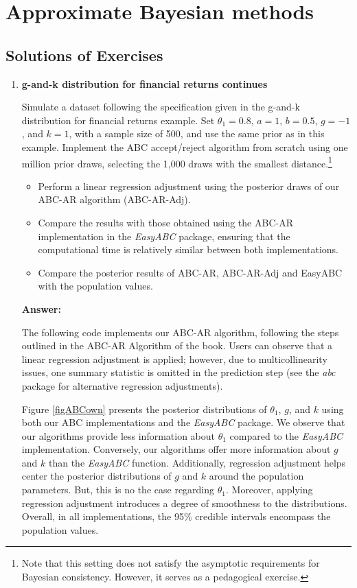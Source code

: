 \chapter{Approximate Bayesian methods}\label{chap15}

\section*{Solutions of Exercises}\label{sec11_1}
\begin{enumerate}[leftmargin=*]

\item \textbf{g-and-k distribution for financial returns continues}

Simulate a dataset following the specification given in the g-and-k distribution for financial returns example. Set $\theta_1 = 0.8$, $a = 1$, $b = 0.5$, $g = -1$, and $k = 1$, with a sample size of 500, and use the same prior as in this example. Implement the ABC accept/reject algorithm from scratch using one million prior draws, selecting the 1,000 draws with the smallest distance.\footnote{Note that this setting does not satisfy the asymptotic requirements for Bayesian consistency. However, it serves as a pedagogical exercise.}

\begin{itemize}
	\item Perform a linear regression adjustment using the posterior draws of our ABC-AR algorithm (ABC-AR-Adj).
	\item Compare the results with those obtained using the ABC-AR implementation in the \textit{EasyABC} package, ensuring that the computational time is relatively similar between both implementations.
	\item Compare the posterior results of ABC-AR, ABC-AR-Adj and EasyABC with the population values.
\end{itemize}

\textbf{Answer:}

The following code implements our ABC-AR algorithm, following the steps outlined in the ABC-AR Algorithm of the book. Users can observe that a linear regression adjustment is applied; however, due to multicollinearity issues, one summary statistic is omitted in the prediction step (see the \textit{abc} package for alternative regression adjustments).  

Figure \ref{figABCown} presents the posterior distributions of $\theta_1$, $g$, and $k$ using both our ABC implementations and the \textit{EasyABC} package. We observe that our algorithms provide less information about $\theta_1$ compared to the \textit{EasyABC} implementation. Conversely, our algorithms offer more information about $g$ and $k$ than the \textit{EasyABC} function. Additionally, regression adjustment helps center the posterior distributions of $g$ and $k$ around the population parameters. But, this is no the case regarding $\theta_1$. Moreover, applying regression adjustment introduces a degree of smoothness to the distributions. Overall, in all implementations, the 95\% credible intervals encompass the population values.


\end{enumerate}
